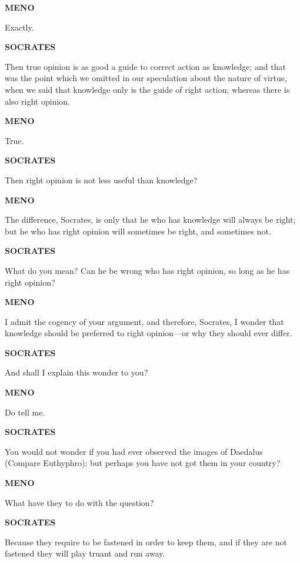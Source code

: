 \documentclass[11pt,letter]{article}
\begin{document}
\par \textbf{MENO}
\par   Exactly.

\par \textbf{SOCRATES}
\par   Then true opinion is as good a guide to correct action as knowledge; and that was the point which we omitted in our speculation about the nature of virtue, when we said that knowledge only is the guide of right action; whereas there is also right opinion.

\par \textbf{MENO}
\par   True.

\par \textbf{SOCRATES}
\par   Then right opinion is not less useful than knowledge?

\par \textbf{MENO}
\par   The difference, Socrates, is only that he who has knowledge will always be right; but he who has right opinion will sometimes be right, and sometimes not.

\par \textbf{SOCRATES}
\par   What do you mean? Can he be wrong who has right opinion, so long as he has right opinion?

\par \textbf{MENO}
\par   I admit the cogency of your argument, and therefore, Socrates, I wonder that knowledge should be preferred to right opinion—or why they should ever differ.

\par \textbf{SOCRATES}
\par   And shall I explain this wonder to you?

\par \textbf{MENO}
\par   Do tell me.

\par \textbf{SOCRATES}
\par   You would not wonder if you had ever observed the images of Daedalus (Compare Euthyphro); but perhaps you have not got them in your country?

\par \textbf{MENO}
\par   What have they to do with the question?

\par \textbf{SOCRATES}
\par   Because they require to be fastened in order to keep them, and if they are not fastened they will play truant and run away.
\end{document}
